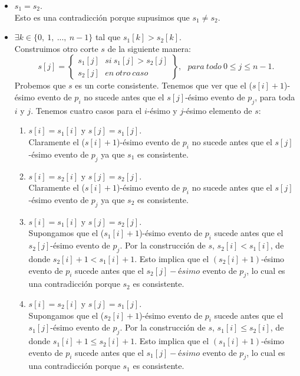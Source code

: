 \documentclass{article}
\begin{document}
\begin{itemize}

    \item $s_1 = s_2$. \\
    Esto es una contradicción porque supusimos que $s_1 \not= s_2$.
    
    \item $\exists k \in \{0,\ 1,\ ...,\ n - 1\}$ tal que $s_1[k] > s_2[k]$. \\
    Construimos otro corte $s$ de la siguiente manera: \\
    \[s[j] = \left\{\begin{array}{lr}
            s_1[j]\ \ \ si\ s_1[j] > s_2[j] \\
            s_2[j]\ \ \ en\ otro\ caso
            \end{array}\right\},\ \ \ para\ todo\ 0 \leq j \leq n - 1.\]
    Probemos que $s$ es un corte consistente. Tenemos que ver que el ($s[i] + 1$)-ésimo evento de $p_i$ no sucede antes que el $s[j]$-ésimo evento de $p_j$, para toda $i$ y $j$.
    Tenemos cuatro casos para el $i$-ésimo y $j$-ésimo elemento de $s$:
    \begin{enumerate}
        \item $s[i] = s_1[i]$ y $s[j] = s_1[j]$. \\
        Claramente el ($s[i] + 1$)-ésimo evento de $p_i$ no sucede antes que el $s[j]$-ésimo evento de $p_j$ ya que $s_1$ es consistente.
        \item $s[i] = s_2[i]$ y $s[j] = s_2[j]$. \\
        Claramente el ($s[i] + 1$)-ésimo evento de $p_i$ no sucede antes que el $s[j]$-ésimo evento de $p_j$ ya que $s_2$ es consistente.
        \item $s[i] = s_1[i]$ y $s[j] = s_2[j]$. \\
        Supongamos que el ($s_1[i] + 1$)-ésimo evento de $p_i$ sucede antes que el $s_2[j]$-ésimo evento de $p_j$. Por la construcción de $s$, $s_2[i] < s_1[i]$, de donde $s_2[i] + 1 < s_1[i] + 1$. Esto implica que el $(s_2[i] + 1)$-ésimo evento de $p_i$ sucede antes que el $s_2[j]-ésimo$ evento de $p_j$, lo cual es una contradicción porque $s_2$ es consistente.
        \item $s[i] = s_2[i]$ y $s[j] = s_1[j]$. \\
        Supongamos que el ($s_2[i] + 1$)-ésimo evento de $p_i$ sucede antes que el $s_1[j]$-ésimo evento de $p_j$. Por la construcción de $s$, $s_1[i] \leq s_2[i]$, de donde $s_1[i] + 1 \leq s_2[i] + 1$. Esto implica que el $(s_1[i] + 1)$-ésimo evento de $p_i$ sucede antes que el $s_1[j]-ésimo$ evento de $p_j$, lo cual es una contradicción porque $s_1$ es consistente.

\end{enumerate}
\end{itemize}
\end{document}
